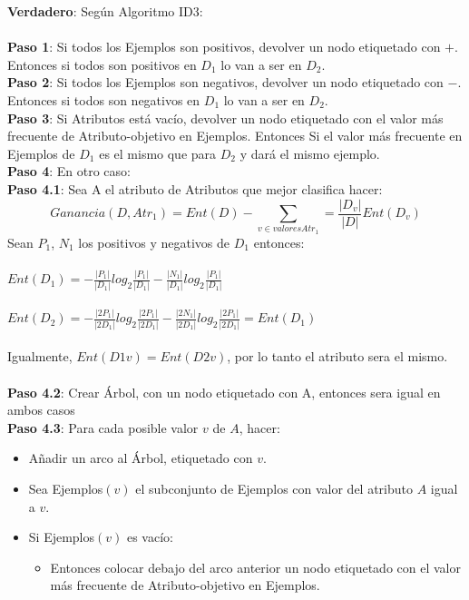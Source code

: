 \documentclass{article}
\begin{document}
\begin{enumerate}
    \textbf{Verdadero}: Según Algoritmo ID3:\\\\
    \textbf{Paso 1}: Si todos los Ejemplos son positivos, devolver un nodo etiquetado con $+$.  Entonces si todos son positivos en $D_1$ lo van a ser en $D_2$.\\
    \textbf{Paso 2}: Si todos los Ejemplos son negativos, devolver un nodo etiquetado con $-$. Entonces si todos son negativos en $D_1$ lo van a ser en $D_2$.\\
    \textbf{Paso 3}: Si Atributos está vacío, devolver un nodo etiquetado con el valor más frecuente de Atributo-objetivo en Ejemplos. Entonces Si el valor más frecuente en Ejemplos de $D_1$ es el mismo que para $D_2$ y dará el mismo ejemplo.\\
    \textbf{Paso 4}: En otro caso:\\
    \textbf{Paso 4.1}: Sea A el atributo de Atributos que mejor clasifica hacer:
    \[Ganancia(D, Atr_1)={Ent}(D)-\sum_{v \in valores Atr_1 }=\frac{|D_v|}{|D|}{Ent}(D_v)\]
    Sean $P_1$, $N_1$ los positivos y negativos de $D_1$ entonces:\\\\
    \(Ent(D_1)=-\frac{|P_1|}{|D_1|}log_2\frac{|P_1|}{|D_1|}-\frac{|N_1|}{|D_1|}log_2\frac{|P_1|}{|D_1|}\)\\\\
    \(Ent(D_2)=-\frac{|2P_1|}{|2D_1|}log_2\frac{|2P_1|}{|2D_1|}-\frac{|2N_1|}{|2D_1|}log_2\frac{|2P_1|}{|2D_1|}=Ent(D_1)\)\\\\
    Igualmente, $Ent(D{1v})=Ent(D{2v})$, por lo tanto el atributo sera el mismo.\\\\
    \textbf{Paso 4.2}: Crear Árbol, con un nodo etiquetado con A, entonces sera igual en ambos casos\\
    \textbf{Paso 4.3}: Para cada posible valor $v$ de $A$, hacer:
    \begin{itemize}
    \item Añadir un arco al Árbol, etiquetado con $v$.
    \item Sea Ejemplos$(v)$ el subconjunto de Ejemplos con valor del atributo $A$ igual a $v$.
    \item Si Ejemplos$(v)$ es vacío:
        \begin{itemize}
        \item Entonces colocar debajo del arco anterior un nodo etiquetado con el valor más frecuente de Atributo-objetivo en Ejemplos.
        \end{itemize}

\end{itemize}
\end{enumerate}
\end{document}
